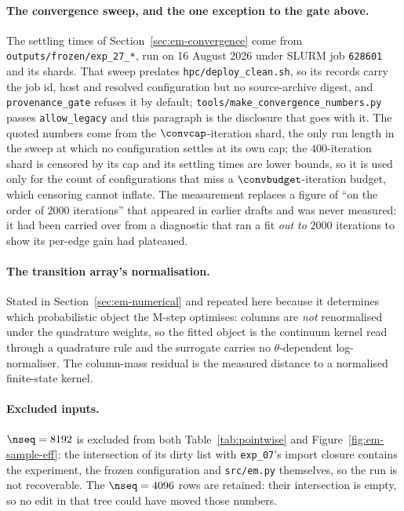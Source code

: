 \paragraph{The convergence sweep, and the one exception to the gate above.}
The settling times of Section~\ref{sec:em-convergence} come from
\texttt{outputs/frozen/exp\_27\_*}, run on 16 August 2026 under SLURM job
\texttt{628601} and its shards. That sweep predates
\texttt{hpc/deploy\_clean.sh}, so its records carry the job id, host and
resolved configuration but no source-archive digest, and
\texttt{provenance\_gate} refuses it by default;
\texttt{tools/make\_convergence\_numbers.py} passes \texttt{allow\_legacy} and
this paragraph is the disclosure that goes with it. The quoted numbers come
from the $\convcap$-iteration shard, the only run length in the sweep at which
no configuration settles at its own cap; the $400$-iteration shard is censored
by its cap and its settling times are lower bounds, so it is used only for the
count of configurations that miss a $\convbudget$-iteration budget, which
censoring cannot inflate. The measurement replaces a figure of ``on the order of
$2000$ iterations'' that appeared in earlier drafts and was never measured: it
had been carried over from a diagnostic that ran a fit \emph{out to} $2000$
iterations to show its per-edge gain had plateaued.

\paragraph{The transition array's normalisation.} Stated in
Section~\ref{sec:em-numerical} and repeated here because it determines which
probabilistic object the M-step optimises: columns are \emph{not} renormalised
under the quadrature weights, so the fitted object is the continuum kernel read
through a quadrature rule and the surrogate carries no $\theta$-dependent
log-normaliser. The column-mass residual is the measured distance to a
normalised finite-state kernel.

\paragraph{Excluded inputs.} $\nseq=8192$ is excluded from both
Table~\ref{tab:pointwise} and Figure~\ref{fig:em-sample-eff}: the
intersection of its dirty list with \texttt{exp\_07}'s import closure
contains the experiment, the frozen configuration and \texttt{src/em.py}
themselves, so the run is not recoverable. The $\nseq=4096$ rows are
retained: their intersection is empty, so no edit in that tree could have
moved those numbers.

